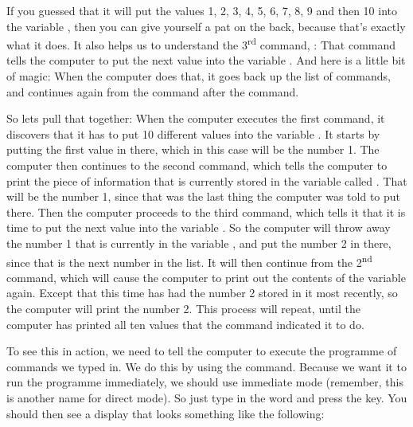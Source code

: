 If you guessed
that it will put the values 1, 2, 3, 4, 5, 6, 7, 8, 9 and then 10 into the variable , then you
can give yourself a pat on the back, because that's exactly what it does.  It also helps us to
understand the 3\textsuperscript{rd} command, : That command tells the computer to put the next value into
the variable .  And here is a little bit of magic: When the computer does that, it goes back
up the list of commands, and continues again from the command after the  command.

So lets pull that together: When the computer executes the first command, it discovers that it has
to put 10 different values into the variable . It starts by putting the first value in there, which
in this case will be the number 1.
The computer then continues to the second command, which tells the computer to print the piece of
information that is currently stored in the variable called . That will be the number 1, since
that was the last thing the computer was told to put there.  Then the computer proceeds to the
third command, which tells it that it is time to put the next value into the variable .  So the
computer will throw away the number 1 that is currently in the variable , and put the number 2 in
there, since that is the next number in the list.  It will then continue from the 2\textsuperscript{nd} command,
which will cause the computer to print out the contents of the variable  again.  Except that this
time  has had the number 2 stored in it most recently, so the computer will print the number 2.
This process will repeat, until the computer has printed all ten values that the  command
indicated it to do.   

\needspace{4cm} %
To see this in action, we need to tell the computer to execute the programme of commands we typed in.
We do this by using the  command. Because we want it to run the programme immediately, we
should use immediate mode (remember, this is another name for direct mode).
So just type in the word  and press the  key.  You should then see a display
that looks something like the following:


